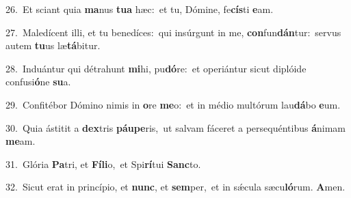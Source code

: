 {\numbfont\textcolor{\numbcolor}{26.}}~Et sciant quia \textbf{ma}\-nus \textbf{tu}\-\textbf{a} hæc:~\star et tu, Dómine, fe\-\textbf{cís}\-ti \textbf{e}\-am.\par
{\numbfont\textcolor{\numbcolor}{27.}}~Maledícent illi, et tu benedíces:~\dagger qui insúrgunt in me, \textbf{con}\-fun\-\textbf{dán}\-tur:~\star servus autem \textbf{tu}\-us læ\-\textbf{tá}\-bitur.\par
{\numbfont\textcolor{\numbcolor}{28.}}~Induántur qui détrahunt \textbf{mi}\-hi, pu\-\textbf{dó}\-re:~\star et operiántur sicut diplóide confusi\-\textbf{ó}\-ne \textbf{su}\-a.\par
{\numbfont\textcolor{\numbcolor}{29.}}~Confitébor Dómino nimis in \textbf{o}\-re \textbf{me}\-o:~\star et in médio multórum lau\-\textbf{dá}\-bo \textbf{e}\-um.\par
{\numbfont\textcolor{\numbcolor}{30.}}~Quia ástitit a \textbf{dex}\-tris \textbf{páu}\-\textbf{pe}ris,~\star ut salvam fáceret a persequéntibus \textbf{á}\-nimam \textbf{me}\-am.\par
{\numbfont\textcolor{\numbcolor}{31.}}~Glória \textbf{Pa}\-tri, et \textbf{Fí}\-\textbf{li}o,~\star et Spi\-\textbf{rí}\-tui \textbf{Sanc}\-to.\par
{\numbfont\textcolor{\numbcolor}{32.}}~Sicut erat in princípio, et \textbf{nunc}\-, et \textbf{sem}\-per,~\star et in sǽcula sæcu\-\textbf{ló}\-rum. \textbf{A}\-men.\par
